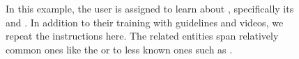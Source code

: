 \begin{figure}[ht]
    \centering
    \caption{
        In this example, the user is assigned to learn about , specifically its  and .
        In addition to their training with guidelines and videos, we repeat the instructions here.
        The related entities span relatively common ones like the  or  to less known ones such as .
    }
    \label{fig:entity-quiz}
\end{figure}

